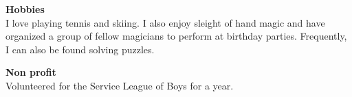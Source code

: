 \documentclass[9pt]{resume}
\begin{document}
    \vspace{0.4cm}
    \begin{minipage}[t]{0.6\textwidth}
        \vspace{-\baselineskip} %
        
        {\Large \textbf{Hobbies}}
        \\I love playing tennis and skiing. I also enjoy sleight of hand magic and have organized a group of fellow magicians to perform at birthday parties.
        Frequently, I can also be found solving puzzles. 
    \end{minipage}
    \hfill
    \begin{minipage}[t]{0.35\textwidth}
        \vspace{-\baselineskip} %
        
        {\Large \textbf{Non profit}}
        \\Volunteered for the Service League of Boys for a year. 
    \end{minipage}
\end{document}
